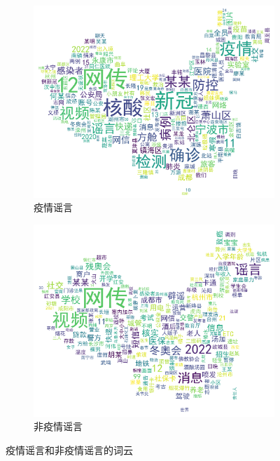 \documentclass[UTF8]{ctexart}
\newcommand{\figwidth}{0.8\linewidth}
\begin{document}
\begin{figure}[!ht]
    \centering
    \begin{subfigure}[b]{0.45\textwidth}
        \centering
        \includegraphics[width=\figwidth]{../figures/wordcloud_covid}
        \caption{疫情谣言}
        \label{subfig:wordcloud_covid}
    \end{subfigure}
    \hfill
    \begin{subfigure}[b]{0.45\textwidth}
        \centering
        \includegraphics[width=\figwidth]{../figures/wordcloud_nocovid}
        \caption{非疫情谣言}
        \label{subfig:wordcloud_nocovid}
    \end{subfigure}
    \caption{疫情谣言和非疫情谣言的词云}
    \label{fig:wordcloud_covid}
\end{figure}
\end{document}
